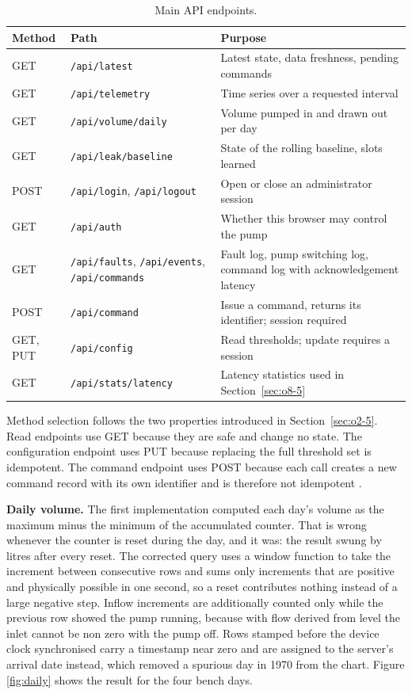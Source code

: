 \begin{table}[H]
\caption{Main API endpoints.}
\label{tab:api}
\centering
\renewcommand{\arraystretch}{1.1}
\begin{tabular}{|p{1.5cm}|p{4.6cm}|p{6.9cm}|}
\hline
\textbf{Method} & \textbf{Path} & \textbf{Purpose} \\
\hline
GET & \texttt{/api/latest} & Latest state, data freshness, pending commands \\
\hline
GET & \texttt{/api/telemetry} & Time series over a requested interval \\
\hline
GET & \texttt{/api/volume/daily} & Volume pumped in and drawn out per day \\
\hline
GET & \texttt{/api/leak/baseline} & State of the rolling baseline, slots learned \\
\hline
POST & \texttt{/api/login}, \texttt{/api/logout} & Open or close an administrator session \\
\hline
GET & \texttt{/api/auth} & Whether this browser may control the pump \\
\hline
GET & \texttt{/api/faults}, \texttt{/api/events}, \texttt{/api/commands} & Fault log, pump switching log, command log with acknowledgement latency \\
\hline
POST & \texttt{/api/command} & Issue a command, returns its identifier; session required \\
\hline
GET, PUT & \texttt{/api/config} & Read thresholds; update requires a session \\
\hline
GET & \texttt{/api/stats/latency} & Latency statistics used in Section~\ref{sec:o8-5} \\
\hline
\end{tabular}
\end{table}

Method selection follows the two properties introduced in Section~\ref{sec:o2-5}. Read endpoints use GET because they are safe and change no state. The configuration endpoint uses PUT because replacing the full threshold set is idempotent. The command endpoint uses POST because each call creates a new command record with its own identifier and is therefore not idempotent \cite{slide05}.

\textbf{Daily volume.} The first implementation computed each day's volume as the maximum minus the minimum of the accumulated counter. That is wrong whenever the counter is reset during the day, and it was: the result swung by litres after every reset. The corrected query uses a window function to take the increment between consecutive rows and sums only increments that are positive and physically possible in one second, so a reset contributes nothing instead of a large negative step. Inflow increments are additionally counted only while the previous row showed the pump running, because with flow derived from level the inlet cannot be non zero with the pump off. Rows stamped before the device clock synchronised carry a timestamp near zero and are assigned to the server's arrival date instead, which removed a spurious day in 1970 from the chart. Figure \ref{fig:daily} shows the result for the four bench days.

